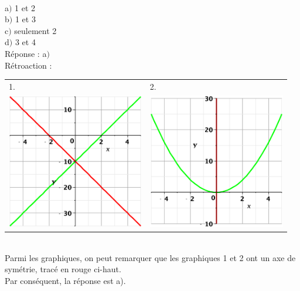 \documentclass[letterpaper, 12pt]{article}
\begin{document}
\begin{tabular}{l l}
\end{tabular}\\

a$)$ 1 et 2\\
b$)$ 1 et 3\\
c$)$ seulement 2\\
d$)$ 3 et 4\\

R\'eponse : a$)$\\

R\'etroaction :\\
\begin{tabular}{l l}
1. & 2. \\
 \includegraphics[width=6cm,bb=20 118 575 673]{Q2134e.eps}
&
 \includegraphics[width=6cm,bb=20 118 575 673]{Q2134f.eps}
\\

\end{tabular}\\
Parmi les graphiques, on peut remarquer que les graphiques 1 et 2 ont un axe de sym\'etrie, trac\'e en rouge ci-haut.\\
Par cons\'equent, la r\'eponse est a).\\
\end{document}

